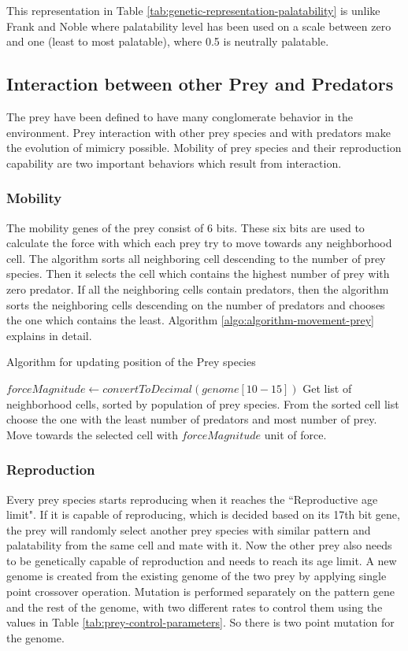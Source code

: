 This representation in Table \ref{tab:genetic-representation-palatability} is unlike Frank and Noble \cite{franks2003} where palatability level has been used on a scale between zero and one (least to most palatable), where 0.5 is neutrally palatable. 

\subsection{Interaction between other Prey and Predators}
The prey have been defined to have many conglomerate behavior in the environment. Prey interaction with other prey species and with predators make the evolution of mimicry possible. Mobility of prey species and their reproduction capability are two important behaviors which result from interaction. 

\subsubsection{Mobility}
The mobility genes of the prey consist of 6 bits. These six bits are used to calculate the force with which each prey try to move towards any neighborhood cell. The algorithm sorts all neighboring cell descending to the number of prey species. Then it selects the cell which contains the highest number of prey with zero predator. If all the neighboring cells contain predators, then the algorithm sorts the neighboring cells descending on the number of predators and chooses the one which contains the least. Algorithm \ref{algo:algorithm-movement-prey} explains in detail.

\begin{algorithm}[H]
	\caption{Algorithm for updating position of the Prey species}
	\label{algo:algorithm-movement-prey}
	\begin{algorithmic}
			\STATE $forceMagnitude \gets convertToDecimal(genome[10-15])$
			\STATE Get list of neighborhood cells, sorted by population of prey species.
			\STATE From the sorted cell list choose the one with the least number of predators and most number of prey.
			\STATE Move towards the selected cell with $forceMagnitude$ unit of force.
		\ENDFOR
	\end{algorithmic}
\end{algorithm}

\subsubsection{Reproduction}
Every prey species starts reproducing when it reaches the ``Reproductive age limit". If it is capable of reproducing, which is decided based on its 17th bit gene, the prey will randomly select another prey species with similar pattern and palatability from the same cell and mate with it. Now the other prey also needs to be genetically capable of reproduction and needs to reach its age limit. A new genome is created from the existing genome of the two prey by applying single point crossover operation. Mutation is performed separately on the pattern gene and the rest of the genome, with two different rates to control them using the values in Table \ref{tab:prey-control-parameters}. So there is two point mutation for the genome. 

